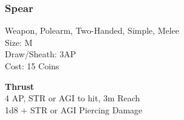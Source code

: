 \subsubsection{Spear}\label{weapon:spear}
Weapon, Polearm, Two-Handed, Simple, Melee\\
Size: M\\
Draw/Sheath: 3AP\\
Cost: 15 Coins

\textbf{Thrust}\\
4 AP, STR or AGI to hit, 3m Reach\\
1d8 + \texttimes STR or AGI Piercing Damage


